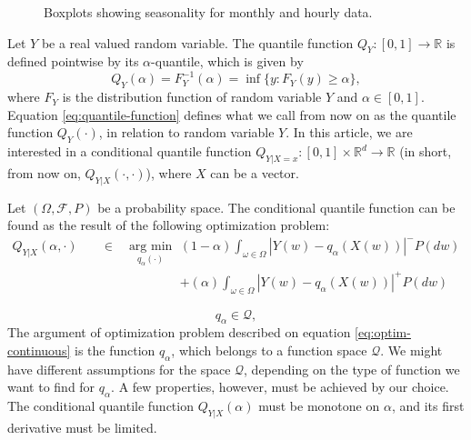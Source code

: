 \begin{figure}
\begin{minipage}[t]{\linewidth}
\begin{minipage}[t]{0.45\linewidth}
			\label{fig:tubarao-boxplot}
		\end{minipage}
	\end{minipage}
	\caption{Boxplots showing seasonality for monthly and hourly data.}
	\label{fig:boxplots}
\end{figure}

Let $Y$ be a real valued random variable. The quantile function $Q_Y:[0,1] \rightarrow \mathbb{R}$ is defined pointwise by its $\alpha$-quantile, which is given by
\begin{equation}
Q_Y(\alpha) = F_Y^{-1}(\alpha) = \inf\{y: F_Y(y) \geq \alpha\},
\label{eq:quantile-function}
\end{equation}
where $F_Y$ is the distribution function of random variable $Y$ and $\alpha \in [0,1]$. Equation \ref{eq:quantile-function} defines what we call from now on as the quantile function $Q_Y(\cdot)$, in relation to random variable $Y$. In this article, we are interested in a conditional quantile function $Q_{Y|X=x}:[0,1] \times \mathbb{R}^d \rightarrow \mathbb{R}$ (in short, from now on, $Q_{Y|X}(\cdot, \cdot)$), where $X$ can be a vector.

Let $(\Omega, \mathcal{F}, P)$ be a probability space. The conditional quantile function can be found as the result of the following optimization problem:
\begin{eqnarray}
Q_{Y|X}(\alpha, \cdot)\quad & \in\quad\underset{q_\alpha(\cdot)}{\text{arg min}}\, &
(1-\alpha)\int_{\omega \in \Omega}|Y(w)-q_\alpha(X(w))|^{-}P(dw) \label{eq:optim-continuous}
\\ & & + (\alpha)\int_{\omega \in \Omega}|Y(w)-q_\alpha(X(w))|^{+}P(dw) \nonumber
\end{eqnarray}

\begin{equation}
q_\alpha  \in \mathcal{Q},
\end{equation}
The argument of optimization problem described on equation \ref{eq:optim-continuous} is the function $q_\alpha$, which belongs to a function space $\mathcal{Q}$. We might have different assumptions for the space $\mathcal{Q}$, depending on the type of function we want to find for $q_\alpha$. A few properties, however, must be achieved by our choice. The conditional quantile function $Q_{Y|X}(\alpha)$ must be monotone on $\alpha$, and its first derivative must be limited.


